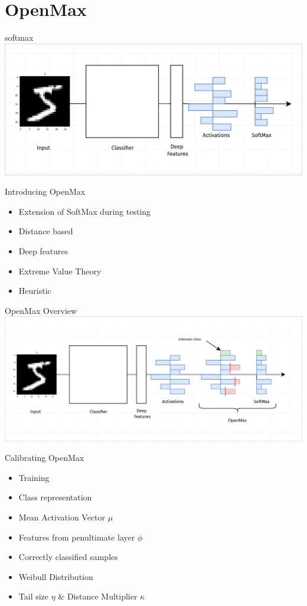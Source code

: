 \section{OpenMax}

\begin{frame}{softmax}
\centering
	\includegraphics[width=\textwidth]{figures/softmax.png}
\end{frame}

\begin{frame}{Introducing OpenMax}
	\begin{itemize}
		\item Extension of SoftMax during testing
		\item Distance based
		\item Deep features
		\item Extreme Value Theory
		\item Heuristic
	\end{itemize}
\end{frame}

\begin{frame}{OpenMax Overview}
	\centering
	\includegraphics[width=\textwidth]{figures/openmax.drawio.png}
\end{frame}


\begin{frame}{Calibrating OpenMax}
	\begin{itemize}
		\item Training
		\item Class representation
		\item Mean Activation Vector $\mu$
		\item Features from penultimate layer $\phi$
		\item Correctly classified samples
		\item Weibull Distribution
		\item Tail size $\eta$ \& Distance Multiplier $\kappa$
	\end{itemize}
\end{frame}

